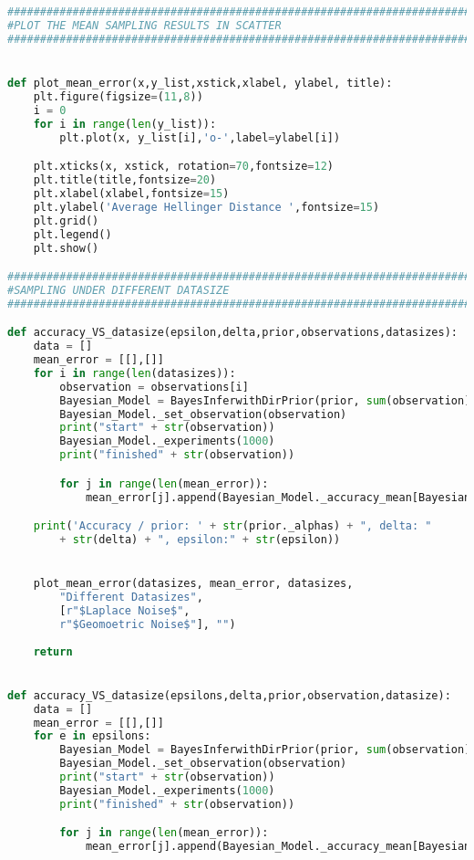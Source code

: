 \begin{lstlisting}[label = code-p2-2a, language=Python, caption=Python Code for experimenting]


#############################################################################
#PLOT THE MEAN SAMPLING RESULTS IN SCATTER 
#############################################################################


def plot_mean_error(x,y_list,xstick,xlabel, ylabel, title):
	plt.figure(figsize=(11,8))
	i = 0	
	for i in range(len(y_list)):
		plt.plot(x, y_list[i],'o-',label=ylabel[i])

	plt.xticks(x, xstick, rotation=70,fontsize=12)
	plt.title(title,fontsize=20)
	plt.xlabel(xlabel,fontsize=15)	
	plt.ylabel('Average Hellinger Distance ',fontsize=15)
	plt.grid()
	plt.legend()
	plt.show()

#############################################################################
#SAMPLING UNDER DIFFERENT DATASIZE 
#############################################################################

def accuracy_VS_datasize(epsilon,delta,prior,observations,datasizes):
	data = []
	mean_error = [[],[]]
	for i in range(len(datasizes)):
		observation = observations[i]
		Bayesian_Model = BayesInferwithDirPrior(prior, sum(observation), epsilon, delta, 0.2)
		Bayesian_Model._set_observation(observation)
		print("start" + str(observation))
		Bayesian_Model._experiments(1000)
		print("finished" + str(observation))

		for j in range(len(mean_error)):
			mean_error[j].append(Bayesian_Model._accuracy_mean[Bayesian_Model._keys[j]])

	print('Accuracy / prior: ' + str(prior._alphas) + ", delta: " 
		+ str(delta) + ", epsilon:" + str(epsilon))


	plot_mean_error(datasizes, mean_error, datasizes, 
		"Different Datasizes", 
		[r"$Laplace Noise$",
		r"$Geomoetric Noise$"], "")
	
	return


def accuracy_VS_datasize(epsilons,delta,prior,observation,datasize):
	data = []
	mean_error = [[],[]]
	for e in epsilons:
		Bayesian_Model = BayesInferwithDirPrior(prior, sum(observation), e, delta, 0.2)
		Bayesian_Model._set_observation(observation)
		print("start" + str(observation))
		Bayesian_Model._experiments(1000)
		print("finished" + str(observation))

		for j in range(len(mean_error)):
			mean_error[j].append(Bayesian_Model._accuracy_mean[Bayesian_Model._keys[j]])


\end{lstlisting}
